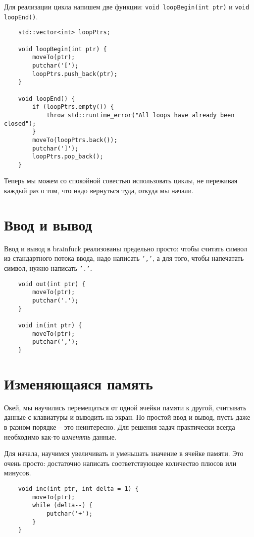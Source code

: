 \documentclass{book}
\begin{document}
Для реализации цикла напишем две функции: \texttt{void loopBegin(int ptr)} и \texttt{void loopEnd()}.

\begin{verbatim}
    std::vector<int> loopPtrs;

    void loopBegin(int ptr) {
        moveTo(ptr);
        putchar('['); 
        loopPtrs.push_back(ptr);
    }

    void loopEnd() {
        if (loopPtrs.empty()) {
            throw std::runtime_error("All loops have already been closed");
        }
        moveTo(loopPtrs.back());
        putchar(']');
        loopPtrs.pop_back();
    }
\end{verbatim}

Теперь мы можем со спокойной совестью использовать циклы, не переживая каждый раз о том, что надо
вернуться туда, откуда мы начали.

\section{Ввод и вывод}
Ввод и вывод в brainfuck реализованы предельно просто: чтобы считать символ из стандартного потока
ввода, надо написать \texttt{','}, а для того, чтобы напечатать символ, нужно написать \texttt{'.'}.

\begin{verbatim}
    void out(int ptr) {
        moveTo(ptr);
        putchar('.');
    }

    void in(int ptr) {
        moveTo(ptr);
        putchar(',');
    }
\end{verbatim}

\section{Изменяющаяся память}
Окей, мы научились перемещаться от одной ячейки памяти к другой, считывать данные с клавиатуры и
выводить на экран. Но простой ввод и вывод, пусть даже в разном порядке -- это неинтересно. Для решения
задач практически всегда необходимо как-то {\em изменять} данные. 

Для начала, научимся увеличивать и уменьшать значение в ячейке памяти. Это очень просто: достаточно
написать соответствующее количество плюсов или минусов.

\begin{verbatim}
    void inc(int ptr, int delta = 1) {
        moveTo(ptr);
        while (delta--) {
            putchar('+');
        }
    }
\end{verbatim}
\end{document}
